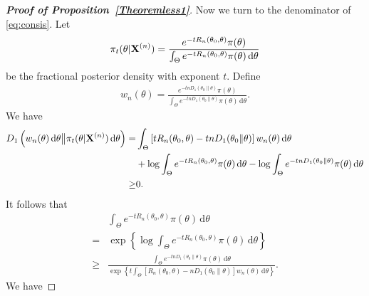 \documentclass[11pt]{article}
\theoremstyle{plain}
\theoremstyle{definition}
\theoremstyle{remark}
\begin{document}
\begin{appendices}
\begin{proof}[\textbf{Proof of Proposition~\ref{Theoremless1}}]
       Now we turn to the denominator of \eqref{eq:consis}.
       Let
       \begin{align*}
           \pi_t( \theta | \mathbf{X}^{(n)})
           =
           \frac{
               e^{-t R_n (\theta_0, \theta)} \pi(\theta) 
           }{
           \int_{\Theta}  e^{-t R_n (\theta_0, \theta)} \pi(\theta) \, \mathrm d \theta
           }
       \end{align*}
       be the fractional posterior density with exponent $t$.
       Define
       \begin{align*}
           w_n(\theta) = \frac{
               e^{ -t n D_1\left( \theta_0 \| \theta \right) } \pi(\theta)
           }{
               \int_{\Theta} e^{ -t n D_1\left( \theta_0 \| \theta \right) } \pi(\theta) \, \mathrm d \theta
           }.
       \end{align*}
We have
\begin{align*}
     D_1\left( 
        w_n (\theta) \, \mathrm d \theta
        \big\|
        \pi_t (\theta | \mathbf{X}^{(n)}) \, \mathrm d \theta
    \right)
    = &
    \int_{\Theta}
    \left[   t R_n(\theta_0, \theta) - tn D_1 (\theta_0 \| \theta )  \right]
    w_n (\theta) \, \mathrm d \theta
    \\
    &
    + \log \int_{\Theta} e^{-t R_n (\theta_0, \theta)} \pi (\theta) \, \mathrm d \theta  
    -\log \int_\Theta e^{-tn D_1 \left( \theta_0 \| \theta \right)} \pi(\theta) \, \mathrm d \theta
    \\
    \geq& 0.
\end{align*}
It follows that
\begin{align*}
    &
        \int_{\Theta} e^{-t R_n (\theta_0, \theta)} \pi (\theta) \, \mathrm d \theta  
    \\
    =&
    \exp
    \left\{ 
    \log \int_{\Theta} e^{-t R_n (\theta_0, \theta)} \pi (\theta) \, \mathrm d \theta  
    \right\}
    \\
    \geq &
    \frac{
        \int_\Theta e^{-tn D_1 \left( \theta_0 \| \theta \right)} \pi(\theta) \, \mathrm d \theta
    }
    {
\exp
\left\{ 
    t
\int_{\Theta}
     \left[    R_n(\theta_0, \theta) - n D_1 (\theta_0 \| \theta )  \right]
    w_n (\theta) \, \mathrm d \theta
\right\}
}
    .
\end{align*}
We have

\end{proof}
\end{appendices}
\end{document}
